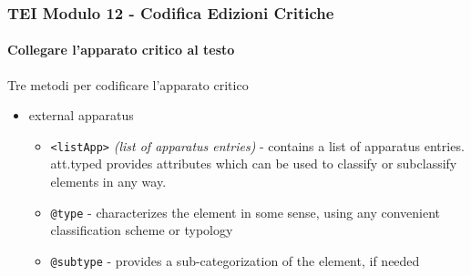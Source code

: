 \begin{frame}
    \frametitle{TEI Modulo 12 - Codifica Edizioni Critiche}
    \framesubtitle{Collegare l'apparato critico al testo}
    \addtocounter{nframe}{1}
  
    \begin{block}{Tre metodi per codificare l'apparato critico}
       \begin{itemize}
           \item external apparatus
           \begin{itemize}
             \item \texttt{<listApp>} \textit{(list of apparatus entries)} - contains a list of apparatus entries. att.typed provides attributes which can be used to classify or subclassify elements in any way.
             \item \texttt{@type} - characterizes the element in some sense, using any convenient classification scheme or typology
             \item \texttt{@subtype} - provides a sub-categorization of the element, if needed
           \end{itemize}
       \end{itemize}
     \end{block}

\end{frame}


